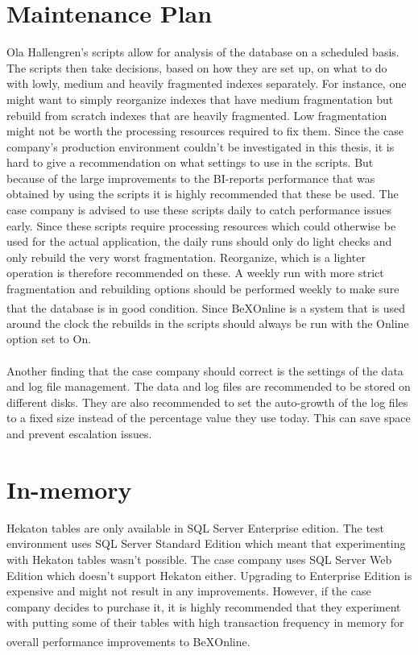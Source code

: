\documentclass{cslthse-msc}
\newcommand{\bex}{BeX\textsuperscript{\textregistered}}
\begin{document}
\section{Maintenance Plan}
Ola Hallengren's \cite{Hallengren15} scripts allow for analysis of the database on a scheduled basis. The scripts then take decisions, based on how they are set up, on what to do with lowly, medium and heavily fragmented indexes separately. For instance, one might want to simply reorganize indexes that have medium fragmentation but rebuild from scratch indexes that are heavily fragmented. Low fragmentation might not be worth the processing resources required to fix them. Since the case company's production environment couldn't be investigated in this thesis, it is hard to give a recommendation on what settings to use in the scripts. But because of the large improvements to the BI-reports performance that was obtained by using the scripts it is highly recommended that these be used. The case company is advised to use these scripts daily to catch performance issues early. Since these scripts require processing resources which could otherwise be used for the actual application, the daily runs should only do light checks and only rebuild the very worst fragmentation. Reorganize, which is a lighter operation is therefore recommended on these. A weekly run with more strict fragmentation and rebuilding options should be performed weekly to make sure that the database is in good condition. Since \bex Online is a system that is used around the clock the rebuilds in the scripts should always be run with the Online option set to On.\\\\
Another finding that the case company should correct is the settings of the data and log file management. The data and log files are recommended to be stored on different disks. They are also recommended to set the auto-growth of the log files to a fixed size instead of the percentage value they use today. This can save space and prevent escalation issues.

\section{In-memory}
Hekaton tables are only available in SQL Server Enterprise edition. The test environment uses SQL Server Standard Edition which meant that experimenting with Hekaton tables wasn't possible. The case company uses SQL Server Web Edition which doesn't support Hekaton either. Upgrading to Enterprise Edition is expensive and might not result in any improvements. However, if the case company decides to purchase it, it is highly recommended that they experiment with putting some of their tables with high transaction frequency in memory for overall performance improvements to \bex Online.
\end{document}
